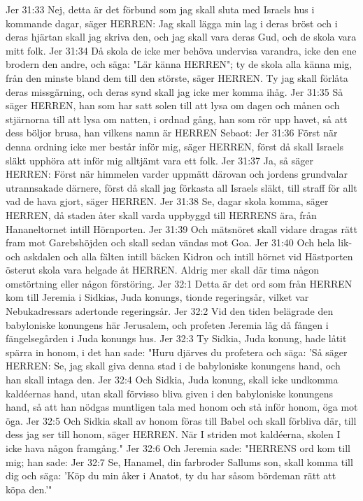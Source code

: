 Jer 31:33  Nej, detta är det förbund som jag skall sluta med Israels hus i kommande dagar, säger HERREN: Jag skall lägga min lag i deras bröst och i deras hjärtan skall jag skriva den, och jag skall vara deras Gud, och de skola vara mitt folk.
Jer 31:34  Då skola de icke mer behöva undervisa varandra, icke den ene brodern den andre, och säga: "Lär känna HERREN"; ty de skola alla känna mig, från den minste bland dem till den störste, säger HERREN. Ty jag skall förlåta deras missgärning, och deras synd skall jag icke mer komma ihåg.
Jer 31:35  Så säger HERREN, han som har satt solen till att lysa om dagen och månen och stjärnorna till att lysa om natten, i ordnad gång, han som rör upp havet, så att dess böljor brusa, han vilkens namn är HERREN Sebaot:
Jer 31:36  Först när denna ordning icke mer består inför mig, säger HERREN, först då skall Israels släkt upphöra att inför mig alltjämt vara ett folk.
Jer 31:37  Ja, så säger HERREN: Först när himmelen varder uppmätt därovan och jordens grundvalar utrannsakade därnere, först då skall jag förkasta all Israels släkt, till straff för allt vad de hava gjort, säger HERREN.
Jer 31:38  Se, dagar skola komma, säger HERREN, då staden åter skall varda uppbyggd till HERRENS ära, från Hananeltornet intill Hörnporten.
Jer 31:39  Och mätsnöret skall vidare dragas rätt fram mot Garebshöjden och skall sedan vändas mot Goa.
Jer 31:40  Och hela lik- och askdalen och alla fälten intill bäcken Kidron och intill hörnet vid Hästporten österut skola vara helgade åt HERREN. Aldrig mer skall där tima någon omstörtning eller någon förstöring.
Jer 32:1  Detta är det ord som från HERREN kom till Jeremia i Sidkias, Juda konungs, tionde regeringsår, vilket var Nebukadressars adertonde regeringsår.
Jer 32:2  Vid den tiden belägrade den babyloniske konungens här Jerusalem, och profeten Jeremia låg då fången i fängelsegården i Juda konungs hus.
Jer 32:3  Ty Sidkia, Juda konung, hade låtit spärra in honom, i det han sade: "Huru djärves du profetera och säga: 'Så säger HERREN: Se, jag skall giva denna stad i de babyloniske konungens hand, och han skall intaga den.
Jer 32:4  Och Sidkia, Juda konung, skall icke undkomma kaldéernas hand, utan skall förvisso bliva given i den babyloniske konungens hand, så att han nödgas muntligen tala med honom och stå inför honom, öga mot öga.
Jer 32:5  Och Sidkia skall av honom föras till Babel och skall förbliva där, till dess jag ser till honom, säger HERREN. När I striden mot kaldéerna, skolen I icke hava någon framgång."
Jer 32:6  Och Jeremia sade: "HERRENS ord kom till mig; han sade:
Jer 32:7  Se, Hanamel, din farbroder Sallums son, skall komma till dig och säga: 'Köp du min åker i Anatot, ty du har såsom bördeman rätt att köpa den.'"
